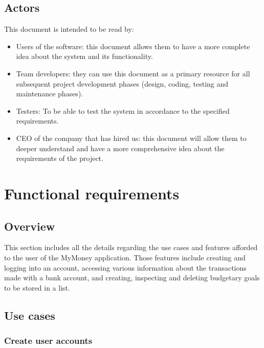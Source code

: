 \documentclass[letterpaper]{article}
\begin{document}
	\newpage
	
	\subsection{Actors}
	
		This document is intended to be read by:
		
		\begin{itemize}
			
			\item Users of the software: this document allows them to have a more complete idea about the system and its functionality.
			
			\item Team developers: they can use this document as a primary resource for all subsequent project development phases (design, coding, testing and maintenance phases).
			
			\item Testers: To be able to test the system in accordance to the specified requirements.
			
			\item CEO of the company that has hired us: this document will allow them to deeper understand and have a more comprehensive idea about the requirements of the project.
			
		\end{itemize}

\newpage

\section{Functional requirements}

	\subsection{Overview}
	
		This section includes all the details regarding the use cases and features afforded to the user of the MyMoney application. Those features include creating and logging into an account, accessing various information about the transactions made with a bank account, and creating, inspecting and deleting budgetary goals to be stored in a list.
	
	\subsection{Use cases}
	
		\subsubsection{Create user accounts}
		
\end{document}
